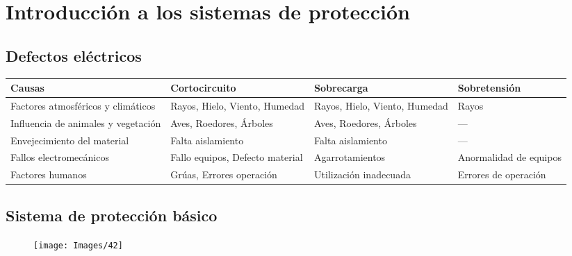 \chapter{Introducción a los sistemas de protección}
\section{Defectos eléctricos}
\begin{table}[H]
	\centering
	\renewcommand{\arraystretch}{1.5} %
	\setlength{\tabcolsep}{5pt} %
	\begin{tabular}{|p{3cm}|p{3cm}|p{3cm}|p{3cm}|}
		\hline
		\textbf{Causas}                           & \textbf{Cortocircuito}                & \textbf{Sobrecarga}                 & \textbf{Sobretensión}           \\ \hline
		Factores atmosféricos y climáticos        & Rayos, Hielo, Viento, Humedad         & Rayos, Hielo, Viento, Humedad       & Rayos                          \\ \hline
		Influencia de animales y vegetación       & Aves, Roedores, Árboles              & Aves, Roedores, Árboles            & ---                            \\ \hline
		Envejecimiento del material               & Falta aislamiento                    & Falta aislamiento                  & ---                            \\ \hline
		Fallos electromecánicos                   & Fallo equipos, Defecto material      & Agarrotamientos                    & Anormalidad de equipos         \\ \hline
		Factores humanos                          & Grúas, Errores operación             & Utilización inadecuada             & Errores de operación           \\ \hline
	\end{tabular}
\end{table}
\section{Sistema de protección básico}
\begin{figure}[H]
	\centering
	\texttt{[image: Images/42]}
	\label{fig:42}
\end{figure}

